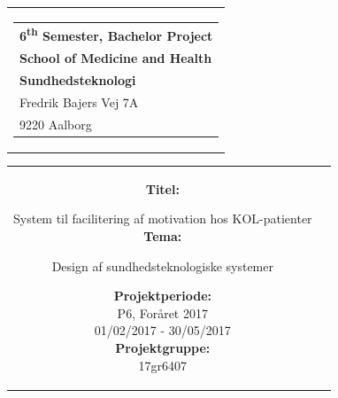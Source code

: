 % 
\thispagestyle{empty}
\begin{titlepage}
\begin{nopagebreak}
{\samepage 

\begin{tabular}{r}
\parbox{\textwidth}{  
\hfill \hspace{2cm} \parbox{8cm}{\begin{tabular}{l} %
{\small \textbf{\textcolor{aaublue}{{6\textsuperscript{th} Semester, Bachelor Project}}}}\\
{\small \textbf{\textcolor{aaublue}{School of Medicine and Health}}}\\
{\small \textbf{\textcolor{aaublue}{Sundhedsteknologi}}}\\
{\small \textcolor{aaublue}{Fredrik Bajers Vej 7A}} \\
{\small \textcolor{aaublue}{9220 Aalborg}} \\
\end{tabular}}}
\end{tabular}

\begin{tabular}{cc}
\parbox{7cm}{

\textbf{Titel:}

System til facilitering af motivation hos KOL-patienter\\ 

\textbf{Tema:}

\small{
Design af sundhedsteknologiske systemer\\
}


\parbox{8cm}{


\textbf{Projektperiode:}\\
P6, Foråret 2017\\
01/02/2017 - 30/05/2017\\
   
\textbf{Projektgruppe:}\\
17gr6407\\ %
  
}}
\end{tabular}}
\end{nopagebreak}
\end{titlepage}
